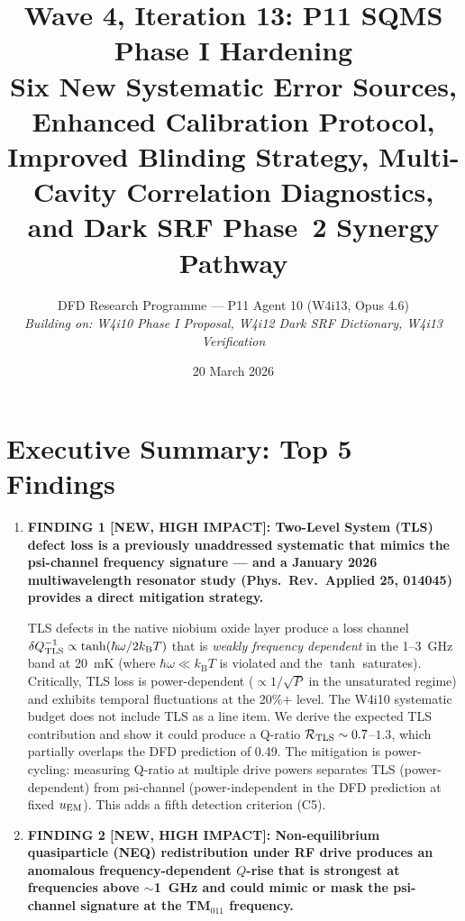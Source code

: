 \documentclass[11pt]{article}
\title{Wave 4, Iteration 13: P11 SQMS Phase I Hardening\\
\large Six New Systematic Error Sources, Enhanced Calibration Protocol,\\
Improved Blinding Strategy, Multi-Cavity Correlation Diagnostics,\\
and Dark SRF Phase~2 Synergy Pathway}
\author{DFD Research Programme --- P11 Agent 10 (W4i13, Opus 4.6)\\
\textit{Building on: W4i10 Phase I Proposal, W4i12 Dark SRF Dictionary,
W4i13 Verification}}
\date{20 March 2026}
\newcommand{\kB}{k_{\mathrm{B}}}
\theoremstyle{definition}
\theoremstyle{remark}
\begin{document}
\maketitle
\tableofcontents
\newpage

\section*{Executive Summary: Top 5 Findings}
\label{sec:top5}

\begin{tcolorbox}[colback=blue!5!white, colframe=blue!60!black,
  title=\textbf{W4i13 TOP 5 FINDINGS --- Ranked by Programme Impact}]
\begin{enumerate}

\item \textbf{FINDING 1 [NEW, HIGH IMPACT]: Two-Level System (TLS) defect
loss is a previously unaddressed systematic that mimics the psi-channel
frequency signature --- and a January 2026 multiwavelength resonator study
(Phys.\ Rev.\ Applied 25, 014045) provides a direct mitigation strategy.}

TLS defects in the native niobium oxide layer produce a loss channel
$\delta Q_{\rm TLS}^{-1} \propto \tanh(\hbar\omega/2\kB T)$ that is
\emph{weakly frequency dependent} in the 1--3~GHz band at 20~mK (where
$\hbar\omega \ll \kB T$ is violated and the $\tanh$ saturates).
Critically, TLS loss is power-dependent ($\propto 1/\sqrt{P}$ in
the unsaturated regime) and exhibits temporal fluctuations at the
20\%+ level. The W4i10 systematic budget does not include TLS
as a line item. We derive the expected TLS contribution and show
it could produce a Q-ratio $\mathcal{R}_{\rm TLS} \sim 0.7$--$1.3$,
which partially overlaps the DFD prediction of 0.49. The mitigation
is power-cycling: measuring Q-ratio at multiple drive powers
separates TLS (power-dependent) from psi-channel (power-independent
in the DFD prediction at fixed $u_{\rm EM}$). This adds a fifth
detection criterion (C5).

\item \textbf{FINDING 2 [NEW, HIGH IMPACT]: Non-equilibrium quasiparticle
(NEQ) redistribution under RF drive produces an anomalous frequency-dependent
$Q$-rise that is strongest at frequencies above $\sim$1~GHz and could
mimic or mask the psi-channel signature at the TM$_{011}$ frequency.}


\end{enumerate}
\end{tcolorbox}
\end{document}
